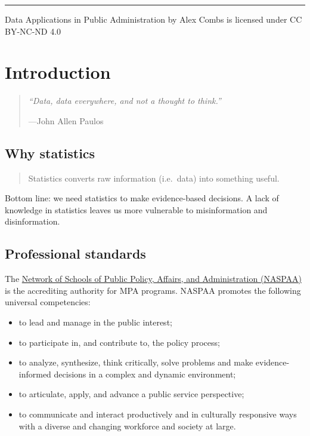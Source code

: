 \documentclass[
]{book}
\providecommand{\tightlist}{%
  \setlength{\itemsep}{0pt}\setlength{\parskip}{0pt}}
\begin{document}
\begin{center}\rule{0.5\linewidth}{0.5pt}\end{center}

{Data Applications in Public Administration} by Alex Combs is licensed under CC BY-NC-ND 4.0

\hypertarget{intro}{%
\chapter{Introduction}\label{intro}}

\begin{quote}
\emph{``Data, data everywhere, and not a thought to think.''}

---John Allen Paulos
\end{quote}

\hypertarget{why-statistics}{%
\section{Why statistics}\label{why-statistics}}

\begin{quote}
Statistics converts raw information (i.e.~data) into something useful.
\end{quote}

Bottom line: we need statistics to make evidence-based decisions. A lack of knowledge in statistics leaves us more vulnerable to misinformation and disinformation.

\hypertarget{professional-standards}{%
\section{Professional standards}\label{professional-standards}}

The \href{https://www.naspaa.org}{Network of Schools of Public Policy, Affairs, and Administration (NASPAA)} is the accrediting authority for MPA programs. NASPAA promotes the following universal competencies:

\begin{itemize}
\tightlist
\item
  to lead and manage in the public interest;
\item
  to participate in, and contribute to, the policy process;
\item
  to analyze, synthesize, think critically, solve problems and make evidence-informed decisions in a complex and dynamic environment;
\item
  to articulate, apply, and advance a public service perspective;
\item
  to communicate and interact productively and in culturally responsive ways with a diverse and changing workforce and society at large.
\end{itemize}
\end{document}
